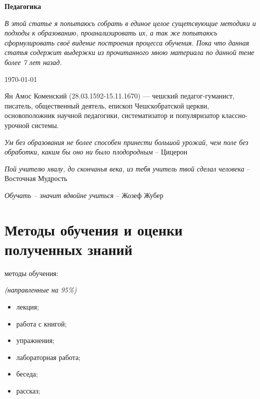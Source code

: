 \documentclass[12pt]{article}			%
\begin{document}
	
	\begin{center}
		\Huge{\textbf{Педагогика}}
	\end{center}
	
	\hfill
	
	\noindent
	\textit{В этой статье я попытаюсь собрать в единое целое сущетсвующие методики и подходы к образованию, проанализировать их, а так же попытаюсь сформулировать своё видение построения процесса обучения. Пока что данная статья содержит выдержки из прочитанного мною материала по данной теме более 7 лет назад.}
	
	\begin{flushright}
		\today
	\end{flushright}
	\hfill
	
	Ян Амос Коменский (28.03.1592-15.11.1670) — чешский педагог-гуманист, писатель, общественный деятель, епископ Чешскобратской церкви, основоположник научной педагогики, систематизатор и популяризатор классно-урочной системы.
	
	\begin{displayquote}
		\textit{
			\dq Ум без образования не более способен принести большой урожай, чем поле без обработки, каким бы оно ни было плодородным \dq
		} -- Цицерон
		
		\textit{
			\dq Пой учителю хвалу, до скончанья века, из тебя учитель твой сделал человека \dq
		} -- Восточная Мудрость
		
		\textit{
			\dq Обучать -- значит вдвойне учиться \dq
		} -- Жозеф Жубер
	\end{displayquote}
	
	
	\section{Методы обучения и оценки полученных знаний}
	
	{ методы обучения:}
	
	\begin{small}{\it(направленные на 95\%)}\end{small}
	\begin{itemize}
		\item лекция;
		\item работа с книгой;
		\item упражнения;
		\item лабораторная работа;
		\item беседа;
		\item рассказ;
	\end{itemize}
	
\end{document}
